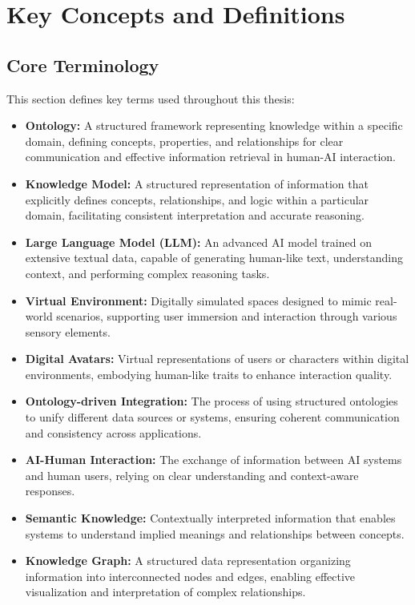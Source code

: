 \section{Key Concepts and Definitions}

\subsection{Core Terminology}
This section defines key terms used throughout this thesis:

\begin{itemize}
    \item \textbf{Ontology:} A structured framework representing knowledge within a specific domain, defining concepts, properties, and relationships for clear communication and effective information retrieval in human-AI interaction.
    
    \item \textbf{Knowledge Model:} A structured representation of information that explicitly defines concepts, relationships, and logic within a particular domain, facilitating consistent interpretation and accurate reasoning.
    
    \item \textbf{Large Language Model (LLM):} An advanced AI model trained on extensive textual data, capable of generating human-like text, understanding context, and performing complex reasoning tasks.
    
    \item \textbf{Virtual Environment:} Digitally simulated spaces designed to mimic real-world scenarios, supporting user immersion and interaction through various sensory elements.
    
    \item \textbf{Digital Avatars:} Virtual representations of users or characters within digital environments, embodying human-like traits to enhance interaction quality.
    
    \item \textbf{Ontology-driven Integration:} The process of using structured ontologies to unify different data sources or systems, ensuring coherent communication and consistency across applications.
    
    \item \textbf{AI-Human Interaction:} The exchange of information between AI systems and human users, relying on clear understanding and context-aware responses.
    
    \item \textbf{Semantic Knowledge:} Contextually interpreted information that enables systems to understand implied meanings and relationships between concepts.
    
    \item \textbf{Knowledge Graph:} A structured data representation organizing information into interconnected nodes and edges, enabling effective visualization and interpretation of complex relationships.
\end{itemize}

